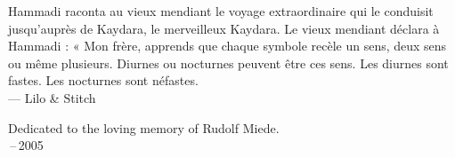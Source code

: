 \thispagestyle{empty}
{}

\vspace*{3cm}

\begin{center}
    Hammadi raconta au vieux mendiant le voyage extraordinaire qui le conduisit
    jusqu'auprès de Kaydara, le merveilleux Kaydara. Le vieux mendiant déclara à Hammadi :
    « Mon frère, apprends que chaque symbole recèle un sens, deux sens ou même plusieurs.
    Diurnes ou nocturnes peuvent être ces sens.
    Les diurnes sont fastes.
    Les nocturnes sont néfastes. \\ \medskip
    --- Lilo \& Stitch
\end{center}

\medskip

\begin{center}
    Dedicated to the loving memory of Rudolf Miede. \\ \,--\,2005
\end{center}
